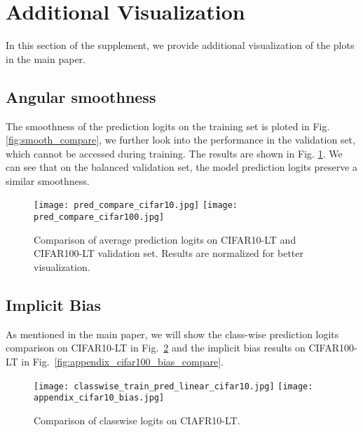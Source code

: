 \documentclass[10pt,twocolumn,letterpaper]{article}
\begin{document}
{\small


}




\newpage
\appendix
\section{Additional Visualization}
In this section of the supplement, we provide additional visualization of the plots in the main paper. 

\subsection{Angular smoothness}
The smoothness of the prediction logits on the training set is ploted in Fig. \ref{fig:smooth_compare}, we further look into the performance in the validation set, which cannot be accessed during training. The results are shown in Fig. \ref{fig:appendix_smooth}. We can see that on the balanced validation set, the model prediction logits preserve a similar smoothness.
\begin{figure}[h]
  \centering
  \texttt{[image: pred\_compare\_cifar10.jpg]}
   \texttt{[image: pred\_compare\_cifar100.jpg]}\vspace{-5pt}
   \caption{Comparison of average prediction logits on CIFAR10-LT and CIFAR100-LT validation set. Results are normalized for better visualization.}
   \label{fig:appendix_smooth}
   \vspace{-5pt}
\end{figure}

\subsection{Implicit Bias}
As mentioned in the main paper, we will show the class-wise prediction logits comparison on CIFAR10-LT in Fig.~\ref{fig:appendix_cifar10_classwise} and the implicit bias results on CIFAR100-LT in Fig.~\ref{fig:appendix_cifar100_bias_compare}. 
\begin{figure}[h]
  \centering
  \texttt{[image: classwise\_train\_pred\_linear\_cifar10.jpg]}
   \texttt{[image: appendix\_cifar10\_bias.jpg]}\vspace{-5pt}
   \caption{Comparison of classwise logits on CIAFR10-LT.}
   \label{fig:appendix_cifar10_classwise}
   \vspace{-5pt}
\end{figure}
\end{document}
